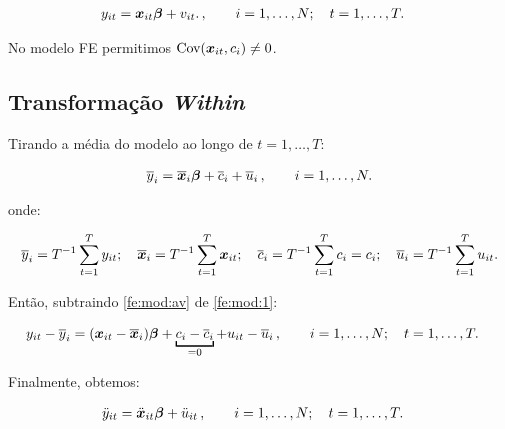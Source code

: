 \documentclass[11pt, oneside, a4paper, article]{article}
\numberwithin{equation}{section}
\begin{document}
\vspace{-1 em}
\begin{align}\label{fe:mod:2}
	y_{it} &= \boldsymbol{x}_{it} \boldsymbol{\beta} + v_{it}.
	\, , \qquad	i = 1, \dots, N; \quad t = 1, \dots, T.
\end{align}

\noindent
No modelo FE permitimos $\text{Cov}(\boldsymbol{x}_{it}, c_{i} ) \neq 0$.

\subsection{Transformação \textit{Within}}

Tirando a média do modelo ao longo de 
$t = 1, \dots, T$:

\vspace{-1 em}
\begin{align} \label{fe:mod:av} %
	\overline{y}_{i} = 
	\overline{\xvec}_{i} \betavec + \overline{c}_{i} + \overline{u}_{i} 
	\, , \qquad	i = 1, \dots, N.
\end{align}

\noindent
onde:

\vspace{-1 em}
\begin{align*}
	\overline{y}_{i} = T^{-1} \sum_{t=1}^{T} y_{it};
	\quad
	\overline{\boldsymbol{x}}_{i} = T^{-1} \sum_{t=1}^{T} \boldsymbol{x}_{it};
	\quad
	\overline{c}_{i} = T^{-1} \sum_{t=1}^{T} c_{i} = c_{i};
	\quad
	\overline{u}_{i} = T^{-1} \sum_{t=1}^{T} u_{it}.
\end{align*}

Então, subtraindo \eqref{fe:mod:av} de \eqref{fe:mod:1}:

\vspace{-1 em}
\begin{align*} %
y_{it} - \overline{y}_{i} &=
(\xvec_{it} - \overline{\xvec}_{i}) \betavec +
\underbracket[1pt]{c_{i} - \overline{c}_{i}}_{=0} +
u_{it} - \overline{u}_{i} 
\, , \qquad	i = 1, \dots, N; \quad t = 1, \dots, T.
\end{align*}

\noindent
Finalmente, obtemos:

\vspace{-1 em}
\begin{align} \label{fe:ddot}
\ddot{y}_{it} &= \ddot{\boldsymbol{x}}_{it} \boldsymbol{\beta} + \ddot{u}_{it} 
\, , \qquad	i = 1, \dots, N; \quad t = 1, \dots, T.
\end{align}
\end{document}
